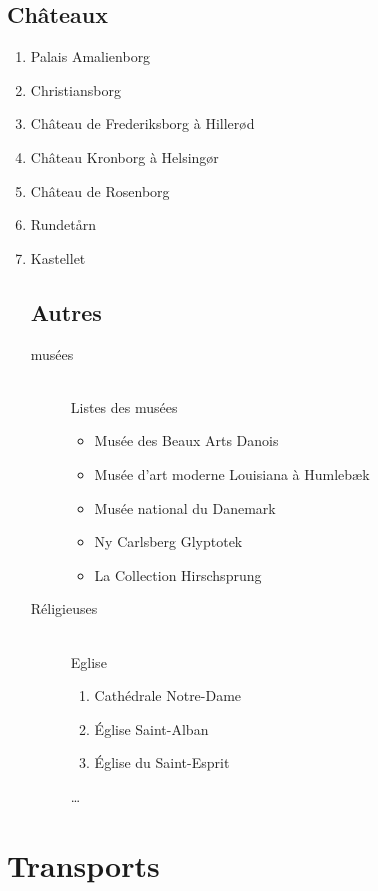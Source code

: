 \documentclass[a4paper,10pt,openany]{memoir}
\begin{document}
\section{Châteaux}
\begin{enumerate}
 \item Palais Amalienborg
 \item Christiansborg
 \item Château de Frederiksborg à Hillerød
 \item Château Kronborg à Helsingør
 \item Château de Rosenborg
 \item Rundetårn
 \item Kastellet
 
 \section{Autres}
 
 \begin{description}
  \item[musées] \hfill \\
  Listes des musées \begin{itemize}
          \item Musée des Beaux Arts Danois
          \item Musée d'art moderne Louisiana à Humlebæk
          \item Musée national du Danemark
          \item Ny Carlsberg Glyptotek
          \item La Collection Hirschsprung
         \end{itemize}

  \item[Réligieuses] \hfill \\
  Eglise \begin{enumerate}
          \item Cathédrale Notre-Dame
          \item Église Saint-Alban
          \item Église du Saint-Esprit
         \end{enumerate}
         \ldots
\end{description}


\end{enumerate}



\chapter{Transports}
\end{document}
